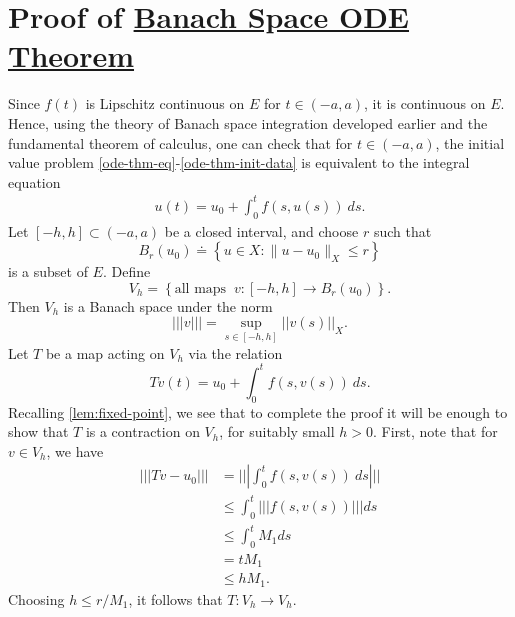 \documentclass[12pt,reqno]{amsart}
\numberwithin{equation}{section}  %
\numberwithin{figure}{section}
\theoremstyle{plain}
\theoremstyle{definition}
\theoremstyle{remark}
\begin{document}
\section{Proof of \hyperref[ode-thm]{Banach Space ODE Theorem}}
	Since $f(t)$ is Lipschitz continuous on $E$ for $t \in (-a, a)$, it is
	continuous on $E$. Hence, using the theory of Banach space integration
  developed earlier and the fundamental theorem of calculus,
  one can check that for $t \in (-a, a)$, the initial value problem
  \eqref{ode-thm-eq}-\eqref{ode-thm-init-data} is equivalent to the
	integral equation
	\begin{equation*}
		\begin{split}
			u(t) = u_0 + \int_0^t f(s, u(s) ) \ ds.
		\end{split}
	\end{equation*}
	Let $[-h, h] \subset (-a, a)$ be a closed interval,
	and choose $r$ such that
	$$B_r(u_0) \doteq \left\{ u \in X: \|u - u_0\|_X \le r \right\}$$
	is a subset of $E$. Define 
	$$V_h = \left\{ \text{all maps} \; \;  v: [-h, h]
		\to B_r(u_0)\right\}.$$ Then $V_h$ is a Banach
		space under the norm $$| | | v | | | = \sup_{s \in [-h, h]} | |v(s) | |_{X}.$$ Let $T$ be a map
	acting on $V_h$ via the relation $$Tv(t) = u_0 + \int_0^t f(s, v(s) ) \ ds.$$
	Recalling \autoref{lem:fixed-point}, we see that to complete the proof it will be enough to show that $T$ is a contraction on
	$V_h$, for suitably small $h >0$. First, note that for $v \in V_h$, we have
\begin{equation}
	\label{cont-map-into}
	\begin{split}
		| | | Tv - u_0| | |
		& = | | | \int_0^t f(s, v(s) ) \ ds | | |
		\\
		& \le  \int_0^t | | | f(s, v(s) ) | | | ds
		\\
		& \le   \int_0^t M_1 ds
		\\
		& =  t M_1
		\\
		& \le  h M_1.
	\end{split}
\end{equation}
%
%
Choosing $h \le r/M_1$, it follows that $T: V_h \to V_h$. 
\end{document}
